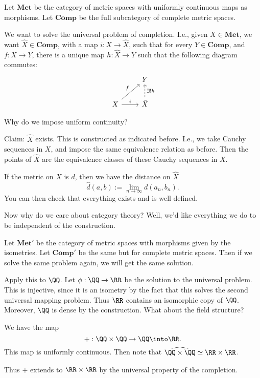 \documentclass{article}
\begin{document}
Let \newcommand\Met{\mathbf{Met}} $\Met$ be the category of 
metric spaces with uniformly continuous maps as morphisms.
Let \newcommand\Comp{\mathbf{Comp}} $\Comp$ be the full 
subcategory of complete metric spaces.

We want to solve the universal problem of completion.
I.e., given $X\in \Met$, we want $\hat{X}\in\Comp$, 
with a map $i:X\to\hat{X}$,
such that
for every $Y\in\Comp$, and $f:X\to Y$, there is a unique 
map $h : \hat{X}\to Y$ such that the following diagram commutes:
\[
\begin{tikzcd}
                                 & Y                                       \\
X \arrow[ru, "f"] \arrow[r, "i"] & \hat{X} \arrow[u, "\exists!h"', dashed]
\end{tikzcd}
    \]

Why do we impose uniform continuity? %

Claim: $\hat{X}$ exists.
This is constructed as indicated before. I.e., we take 
Cauchy sequences in $X$, and impose the same equivalence
relation as before. Then the points of $\hat{X}$ are the 
equivalence classes of these Cauchy sequences in $X$.

If the metric on $X$ is $d$, then we have 
the distance on $\hat{X}$
\[ \hat{d}(a,b):= \lim_{n\to\infty} d(a_n,b_n). \]
You can then check that everything exists and is well defined.

Now why do we care about category theory? Well, we'd like 
everything we do to be independent of the construction.

Let $\Met'$ be the category of metric spaces with morphisms 
given by the isometries. Let $\Comp'$ be the same but 
for complete metric spaces. Then if we solve the same 
problem again, we will get the same solution. 

Apply this to $\QQ$. Let $\phi:\QQ\to \RR$ be the solution 
to the universal problem. This is injective, since it is 
an isometry by the fact that this solves the second universal
mapping problem. Thus $\RR$ contains an isomorphic copy of $\QQ$.
Moreover, $\QQ$ is dense by the construction. What about the 
field structure?

We have the map \[ +:\QQ\times \QQ \to \QQ \into\RR. \]
This map is uniformly continuous. Then 
note that $\widehat{\QQ\times \QQ} \simeq \RR\times \RR$.

Thus $+$ extends to $\RR\times \RR$ by the universal property 
of the completion.
\end{document}
